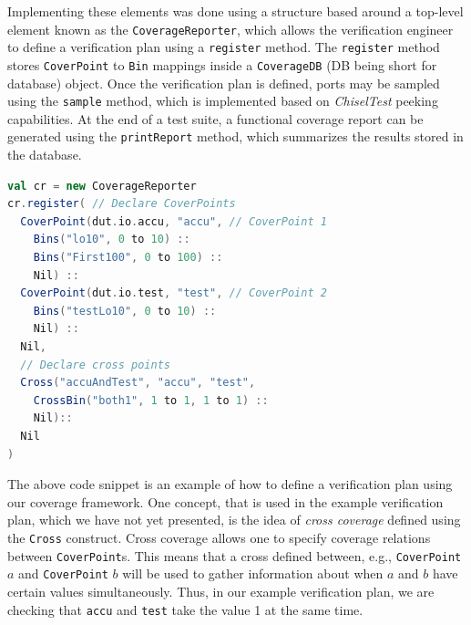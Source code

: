 \documentclass[conference]{IEEEtran}
\begin{document}
Implementing these elements was done using a structure based around a top-level element known as the \texttt{CoverageReporter}, which allows the verification engineer to define a verification plan using a \texttt{register} method. The \texttt{register} method stores \texttt{CoverPoint} to \texttt{Bin} mappings inside a \texttt{CoverageDB} (DB being short for database) object. Once the verification plan is defined, ports may be sampled using the \texttt{sample} method, which is implemented based on \textit{ChiselTest} peeking capabilities. At the end of a test suite, a functional coverage report can be generated using the \texttt{printReport} method, which summarizes the results stored in the database.

\begin{lstlisting}[language=scala]
val cr = new CoverageReporter
cr.register( // Declare CoverPoints
  CoverPoint(dut.io.accu, "accu", // CoverPoint 1
    Bins("lo10", 0 to 10) ::
    Bins("First100", 0 to 100) ::
    Nil) ::
  CoverPoint(dut.io.test, "test", // CoverPoint 2
    Bins("testLo10", 0 to 10) ::
    Nil) ::
  Nil,
  // Declare cross points
  Cross("accuAndTest", "accu", "test", 
    CrossBin("both1", 1 to 1, 1 to 1) ::
    Nil)::
  Nil
)
\end{lstlisting}

The above code snippet is an example of how to define a verification plan using our coverage framework. One concept, that is used in the example verification plan, which we have not yet presented, is the idea of \textit{cross coverage} defined using the \texttt{Cross} construct. Cross coverage allows one to specify coverage relations between \texttt{CoverPoint}s. This means that a cross defined between, e.g., \texttt{CoverPoint} $a$ and \texttt{CoverPoint} $b$ will be used to gather information about when $a$ and $b$ have certain values simultaneously. Thus, in our example verification plan, we are checking that \texttt{accu} and \texttt{test} take the value 1 at the same time.
\end{document}
